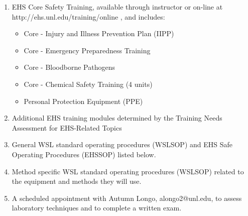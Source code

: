 \begin{enumerate}
	\item 	EHS Core Safety Training, available through instructor or on-line at http://ehs.unl.edu/training/online , and includes:
	\begin{itemize}
		\item Core - Injury and Illness Prevention Plan (IIPP)
		\item Core - Emergency Preparedness Training
		\item Core - Bloodborne Pathogens
		\item Core - Chemical Safety Training (4 units)
		\item Personal Protection Equipment (PPE)	
	\end{itemize}
	\item Additional EHS training modules determined by the Training Needs Assessment for EHS-Related Topics
	\item General WSL standard operating procedures (WSLSOP) and EHS Safe Operating Procedures (EHSSOP) listed below. 
	\item Method specific WSL standard operating procedures (WSLSOP) related to the equipment and methods they will use. 
	\item A scheduled appointment with Autumn Longo, alongo2@unl.edu, to assess laboratory techniques and to complete a written exam.  
\end{enumerate}

